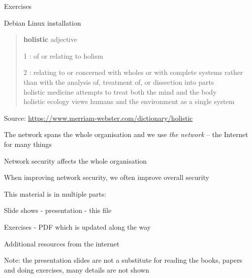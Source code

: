\documentclass[Screen16to9,17pt]{foils}
\begin{document}
Exercises
\begin{list2}
\item Debian Linux installation
\end{list2}




\begin{quote}
{\bf\Large holistic} adjective

\begin{list2}
\item[1]: of or relating to holism
\item[2] : relating to or concerned with wholes or with complete systems rather than with the analysis of, treatment of, or dissection into parts\\
holistic medicine attempts to treat both the mind and the body\\
holistic ecology views humans and the environment as a single system
\end{list2}
\end{quote}
Source: \url{https://www.merriam-webster.com/dictionary/holistic}

\begin{list2}
\item The network spans the whole organisation and we use \emph{the network} -- the Internet for many things
\item Network security affects the whole organisation
\item When improving network security, we often improve overall security
\end{list2}



\begin{list1}
\item This material is in multiple parts:

\item Slide shows - presentation - this file
\item Exercises - PDF which is updated along the way

\item Additional resources from the internet

\end{list1}

{\Large Note: the presentation slides are not a substitute for reading the books, papers and doing exercises, many details are not shown}
\end{document}
